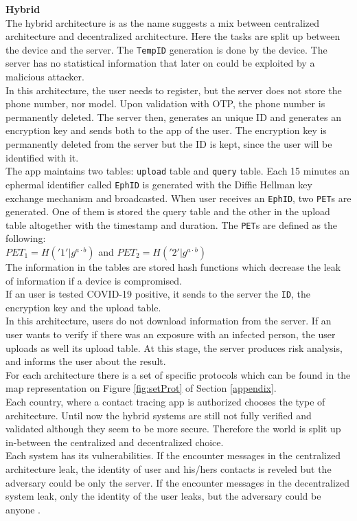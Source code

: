 \documentclass[a4paper, twocolumn]{article}
\begin{document}
\noindent \textbf{Hybrid}\\
The hybrid architecture is as the name suggests a mix between centralized architecture and decentralized architecture. Here the tasks are split up between the device and the server. The \texttt{TempID} generation is done by the device. The server has no statistical information that later on could be exploited by a malicious attacker.\\
In this architecture, the user needs to register, but the server does not store the phone number, nor model. Upon validation with OTP, the phone number is permanently deleted. The server then, generates an unique ID and generates an encryption key and sends both to the app of the user. The encryption key is permanently deleted from the server but the ID is kept, since the user will be identified with it.\\
The app maintains two tables: \texttt{upload} table and \texttt{query} table. Each 15 minutes an ephermal identifier called \texttt{EphID} is generated with the Diffie Hellman key exchange mechanism \cite{diffie} and broadcasted. When user receives an \texttt{EphID}, two \texttt{PET}s are generated. One of them is stored the query table and the other in the upload table altogether with the timestamp and duration. The \texttt{PET}s are defined as the following: \\
$PET_1 = H('1'|g^{a\cdot b})$ and $PET_2 = H('2'|g^{a\cdot b})$ \\
The information in the tables are stored hash functions which decrease the leak of information if a device is compromised.\\
If an user is tested COVID-19 positive, it sends to the server the \texttt{ID}, the encryption key and the upload table.\\
In this architecture, users do not download information from the server. If an user wants to verify if there was an exposure with an infected person, the user uploads as well its upload table. At this stage, the server produces risk analysis, and informs the user about the result.\\

\noindent For each architecture there is a set of specific protocols which can be found in the map representation on Figure \ref{fig:setProt} of Section \ref{appendix}.\\

\noindent Each country, where a contact tracing app is authorized chooses the type of architecture. Until now the hybrid systems are still not fully verified and validated although they seem to be more secure. Therefore the world is split up in-between the centralized and decentralized choice.\\
Each system has its vulnerabilities. If the encounter messages in the centralized architecture leak, the identity of user and his/hers contacts is reveled but the adversary could be only the server. If the encounter messages in the decentralized system leak, only the identity of the user leaks, but the adversary could be anyone \cite{orOr}.\\
\end{document}
